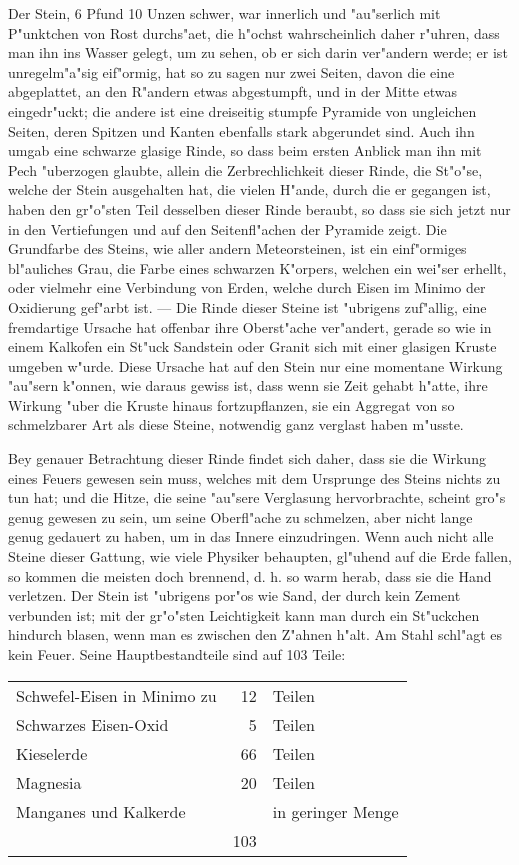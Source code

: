 \documentclass[a4paper, 11pt, oneside, polutonikogreek, german]{article}
\begin{document}
Der Stein, 6 Pfund 10 Unzen schwer, war innerlich und "au"serlich mit P"unktchen von Rost durchs"aet, die h"ochst wahrscheinlich daher r"uhren, dass man ihn ins Wasser gelegt, um zu sehen, ob er sich darin ver"andern werde; er ist unregelm"a"sig eif"ormig, hat so zu sagen nur zwei Seiten, davon die eine abgeplattet, an den R"andern etwas abgestumpft, und in der Mitte etwas eingedr"uckt; die andere ist eine dreiseitig stumpfe Pyramide von ungleichen Seiten, deren Spitzen und Kanten ebenfalls stark abgerundet sind. Auch ihn umgab eine schwarze glasige Rinde, so dass beim ersten Anblick man ihn mit Pech "uberzogen glaubte, allein die Zerbrechlichkeit dieser Rinde, die St"o"se, welche der Stein ausgehalten hat, die vielen H"ande, durch die er gegangen ist, haben den gr"o"sten Teil desselben dieser Rinde beraubt, so dass sie sich jetzt nur in den Vertiefungen und auf den Seitenfl"achen der Pyramide zeigt. Die Grundfarbe des Steins, wie aller andern Meteorsteinen, ist ein einf"ormiges bl"auliches Grau, die Farbe eines schwarzen K"orpers, welchen ein wei"ser erhellt, oder vielmehr eine Verbindung von Erden, welche durch Eisen im Minimo der Oxidierung gef"arbt ist. --- Die Rinde dieser Steine ist "ubrigens zuf"allig, eine fremdartige Ursache hat offenbar ihre Oberst"ache ver"andert, gerade so wie in einem Kalkofen ein St"uck Sandstein oder Granit sich mit einer glasigen Kruste umgeben w"urde. Diese Ursache hat auf den Stein nur eine momentane Wirkung "au"sern k"onnen, wie daraus gewiss ist, dass wenn sie Zeit gehabt h"atte, ihre Wirkung "uber die Kruste hinaus fortzupflanzen, sie ein Aggregat von so schmelzbarer Art als diese Steine, notwendig ganz verglast haben m"usste.

Bey genauer Betrachtung dieser Rinde findet sich daher, dass sie die Wirkung eines Feuers gewesen sein muss, welches mit dem Ursprunge des Steins nichts zu tun hat; und die Hitze, die seine "au"sere Verglasung hervorbrachte, scheint gro"s genug gewesen zu sein, um seine Oberfl"ache zu schmelzen, aber nicht lange genug gedauert zu haben, um in das Innere einzudringen. Wenn auch nicht alle Steine dieser Gattung, wie viele Physiker behaupten, gl"uhend auf die Erde fallen, so kommen die meisten doch brennend, d. h. so warm herab, dass sie die Hand verletzen. Der Stein ist "ubrigens por"os wie Sand, der durch kein Zement verbunden ist; mit der gr"o"sten Leichtigkeit kann man durch ein St"uckchen hindurch blasen, wenn man es zwischen den Z"ahnen h"alt. Am Stahl schl"agt es kein Feuer. Seine Hauptbestandteile sind auf 103 Teile:
\begin{table}[H]
    \centering
    \Large
    \frakfamily
    \begin{tabular}{l r l}
        Schwefel-Eisen in Minimo zu & 12 & Teilen \\
        Schwarzes Eisen-Oxid & 5 & Teilen \\
        Kieselerde & 66 & Teilen \\
        Magnesia & 20 & Teilen \\
        Manganes und Kalkerde & ~ & in geringer Menge \\ \hline
         ~ & 103 & ~ \\ 
    \end{tabular}
\end{table}
\end{document}
